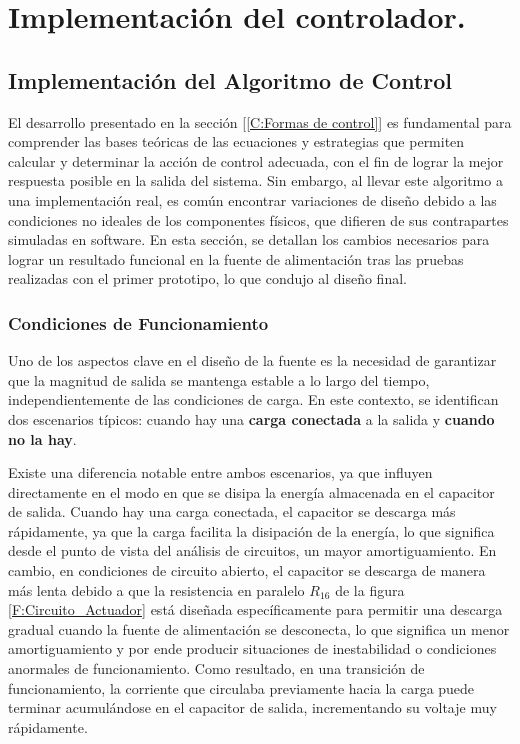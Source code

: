 \chapter{Implementación del controlador.}

\label{C:Implementación del algoritmo de control}
\section{Implementación del Algoritmo de Control}
El desarrollo presentado en la sección  [\ref{C:Formas de control}] es fundamental para comprender las bases teóricas de las ecuaciones y estrategias que permiten calcular y determinar la acción de control adecuada, con el fin de lograr la mejor respuesta posible en la salida del sistema. Sin embargo, al llevar este algoritmo a una implementación real, es común encontrar variaciones de diseño debido a las condiciones no ideales de los componentes físicos, que difieren de sus contrapartes simuladas en software. En esta sección, se detallan los cambios necesarios para lograr un resultado funcional en la fuente de alimentación tras las pruebas realizadas con el primer prototipo, lo que condujo al diseño final.\par

\subsection{Condiciones de Funcionamiento}
Uno de los aspectos clave en el diseño de la fuente es la necesidad de garantizar que la magnitud de salida se mantenga estable a lo largo del tiempo, independientemente de las condiciones de carga. En este contexto, se identifican dos escenarios típicos: cuando hay una \textbf{carga conectada} a la salida y \textbf{cuando no la hay}. \par
Existe una diferencia notable entre ambos escenarios, ya que influyen directamente en el modo en que se disipa la energía almacenada en el capacitor de salida. Cuando hay una carga conectada, el capacitor se descarga más rápidamente, ya que la carga facilita la disipación de la energía, lo que significa desde el punto de vista del análisis de circuitos, un mayor amortiguamiento. En cambio, en condiciones de circuito abierto, el capacitor se descarga de manera más lenta debido a que la resistencia en paralelo $R_{16}$ de la figura \ref{F:Circuito_Actuador} está diseñada específicamente para permitir una descarga gradual cuando la fuente de alimentación se desconecta, lo que significa un menor amortiguamiento y por ende producir situaciones de inestabilidad o condiciones anormales de funcionamiento. Como resultado, en una transición de funcionamiento, la corriente que circulaba previamente hacia la carga puede terminar acumulándose en el capacitor de salida, incrementando su voltaje muy rápidamente. \par

